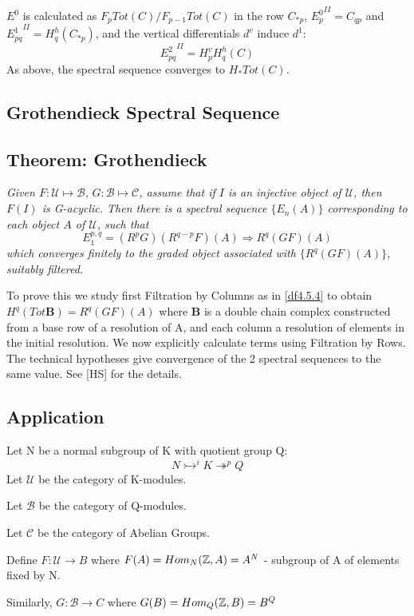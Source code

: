 $E^0$ is calculated as $F_p Tot (C) / F_{p-1} Tot(C)$ in the row
$C_{*p}$, ${E_p^0}^{II} = C_{qp}$ and ${E_{pq}^1}^{II} =
H^h_q(C_{*p})$, and the vertical differentials $d^v$ induce $d^1$:
$${E_{pq}^2}^{II} = H_p^v H_q^h (C)$$
As above, the spectral sequence converges to $H_* Tot (C)$.




\subsection{Grothendieck Spectral Sequence}\label{df4.6}

\subsection{Theorem: Grothendieck}\label{df4.6.1}
\emph{Given $F : \mathcal U \mapsto \mathcal B,\, G:\mathcal B
\mapsto \mathcal C$, assume that if $I$ is an injective object of
$\mathcal U$, then $F(I)$ is G-acyclic. Then there is a spectral
sequence $\{ E_n (A) \}$ corresponding to each object $A$ of
$\mathcal U$, such that
$$E_1^{p,q} = (R^pG)(R^{q-p}F)(A) \Longrightarrow R^q(GF)(A)$$
which converges finitely to the graded object associated with
$\{R^q (GF)(A)\}$, suitably filtered.}

 To prove this we study first Filtration by Columns as in
 \ref{df4.5.4} to obtain \\$H^q(Tot\mathbf B)= R^q (GF)(A)$ where
 $\mathbf B$ is a double chain complex constructed from a base row
 of a resolution of A, and each column a resolution of elements in
 the initial resolution. We now explicitly calculate terms using Filtration by
 Rows. The technical hypotheses give convergence of the 2 spectral
 sequences to the same value. See [HS] for the details.

 \subsection{Application}\label{df4.6.2}
 Let N be a normal subgroup of K with quotient group Q:
 $$N\rightarrowtail^i K \twoheadrightarrow ^p Q$$
 Let $\mathcal U$ be the category of K-modules.

 Let $\mathcal B$ be the category of Q-modules.

 Let $\mathcal C$ be the category of Abelian Groups.

Define $F:\mathcal U\rightarrow B$ where $F(A) = Hom_N(\mathbb Z ,A) =
A^N$ - subgroup of A of elements fixed by N.

Similarly, $G:\mathcal B\rightarrow C$ where $G(B) = Hom_Q(\mathbb Z ,B)
= B^Q$

